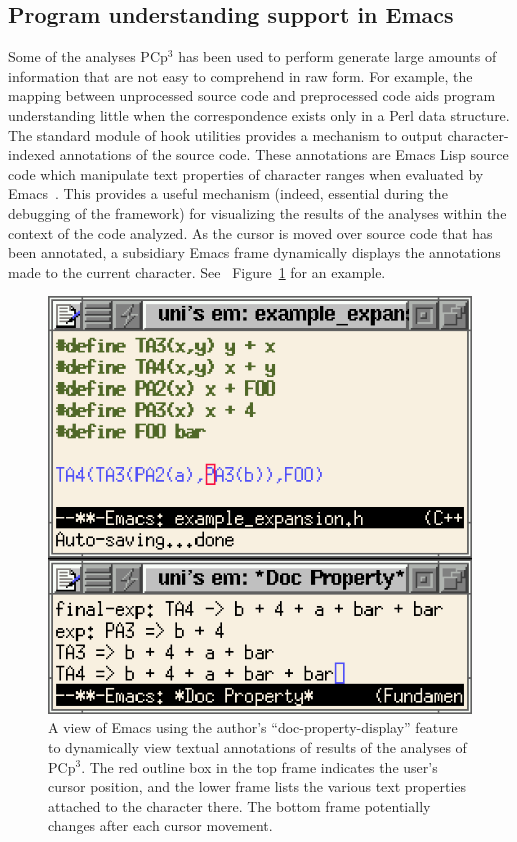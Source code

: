 \documentclass{article}
\newcommand{\pcp}{\mbox{\textsf{PCp}$^3$}}
\newcommand{\Perl}{\mbox{Perl}}
\newcommand{\figref}[1]{Figure~\ref{#1}}
\begin{document}
\subsection{Program understanding support in Emacs}
Some of the analyses \pcp{} has been used to perform generate large amounts of
information that are not easy to comprehend in raw form.  For example,
the mapping between unprocessed source code and preprocessed code aids
program understanding little when the correspondence exists only in a
\Perl{} data structure.
The standard module of hook utilities provides a
mechanism to output character-indexed annotations of the source code.
These annotations are Emacs Lisp source code which manipulate text
properties of character ranges when evaluated by Emacs~\cite{GNUELisp}.  This
provides a useful mechanism (indeed, essential during the debugging of
the framework) for visualizing the results of the analyses within the
context of the code analyzed.  As the cursor is moved over source code
that has been annotated, a subsidiary Emacs frame dynamically displays
the annotations made to the current character. See
~\figref{fig:emacsdocprop} for an example.

\begin{figure}[b!]
  \begin{center}
    \leavevmode
    \includegraphics{figs/doc-prop.ps}
    \caption{A view of Emacs using the author's ``doc-property-display''
      feature to dynamically view textual annotations of results of the
      analyses of \pcp{}.  The red outline box in the top frame
      indicates the user's cursor position, and the lower frame lists the
      various text properties attached to the character there.
      The bottom frame potentially changes after each cursor movement.}
    \label{fig:emacsdocprop}
  \end{center}
\end{figure}
\end{document}

